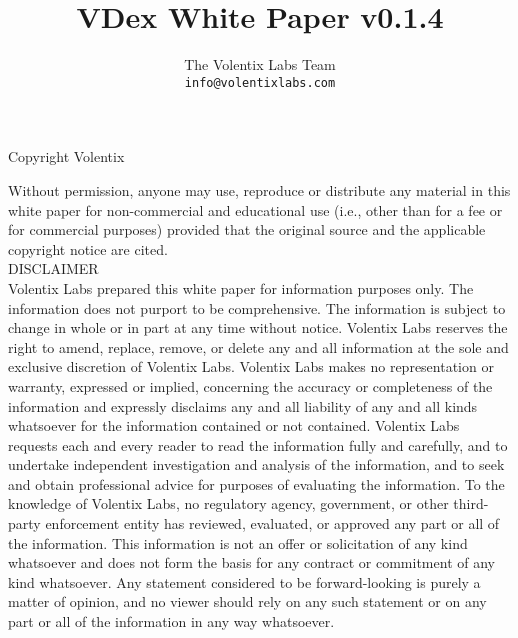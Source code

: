 \documentclass[]{article}
\title{VDex White Paper v0.1.4}
\author{
		The Volentix Labs Team\\
	\texttt{info@volentixlabs.com}
}
\begin{document}
\tableofcontents
\maketitle
\begin{description}
\item Copyright  Volentix
\end{description}

{\tiny Without permission, anyone may use, reproduce or distribute any material in this white paper for non-commercial and educational use (i.e., other than for a fee or for commercial purposes) provided that the original source and the applicable copyright notice are cited.\\

DISCLAIMER \\

Volentix Labs prepared this white paper for information purposes only. The information does not purport to be comprehensive. The information is subject to change in whole or in part at any time without notice. Volentix Labs reserves the right to amend, replace, remove, or delete any and all information at the sole and exclusive discretion of Volentix Labs. Volentix Labs makes no representation or warranty, expressed or implied, concerning the accuracy or completeness of the information and expressly disclaims any and all liability of any and all kinds whatsoever for the information contained or not contained. Volentix Labs requests each and every reader to read the information fully and carefully, and to undertake independent investigation and analysis of the information, and to seek and obtain professional advice for purposes of evaluating the information. To the knowledge of Volentix Labs, no regulatory agency, government, or other third-party enforcement entity has reviewed, evaluated, or approved any part or all of the information. This information is not an offer or solicitation of any kind whatsoever and does not form the basis for any contract or commitment of any kind whatsoever. Any statement considered to be forward-looking is purely a matter of opinion, and no viewer should rely on any such statement or on any part or all of the information in any way whatsoever.

}
\end{document}
